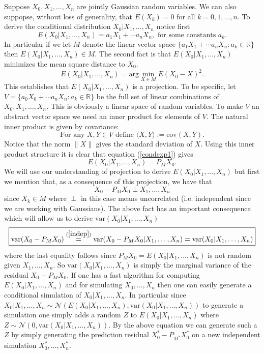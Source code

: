 \documentclass[11pt]{report}
\begin{document}
Suppose $X_0,X_1,\ldots, X_n$ are jointly Gaussian random variables. We can also suppopse, without loss of generality, that $E(X_k)=0$ for all $k=0,1,\ldots, n$.
To derive the conditional distribution $X_0|X_1,\ldots, X_n$ notice first
\[
{E(X_0|X_1,\ldots, X_n) = a_1 X_1 + \cdots a_n X_n,\text{ for some constants $a_k$.}}
\]
In particular if we let $M$ denote the linear vector space $\{a_1 X_1 + \cdots a_n X_n: a_k\in\mathbb R\}$ then $E(X_0|X_1,\ldots, X_n)\in M$. The second fact is that  $E(X_0|X_1,\ldots, X_n)$ minimizes the mean square distance to $X_0$. 
\begin{equation}\label{condexp1}
{E(X_0|X_1,\ldots, X_n) = \text{arg}\min_{X \in M} E(X_0 - X)^2. }
\end{equation}
 This establishes that $E(X_0|X_1,\ldots, X_n)$ is a projection. To be specific, let $V=\{a_0 X_0 + \cdots a_n X_n: a_k\in\mathbb R\}$ be the full set of linear combinations of $X_0,X_1,\ldots, X_n$. This is obviously a linear space of random variables. To make $V$ an abstract vector space we need an inner product for elements of $V$. The natural inner product is given by covariance:
\[ \text{For any $X,Y\in V$ define $\langle X,Y\rangle :=\text{cov}(X,Y)$.}  \]
Notice that the norm $\| X\|$ gives the standard deviation of $X$. Using this inner product structure it is clear that equation (\ref{condexp1}) gives
\begin{equation}
\label{condexp2} 
\boxed{E(X_0|X_1,\ldots, X_n) = P_M X_0.} 
\end{equation}
We will use our understanding of projection to derive $E(X_0|X_1,\ldots, X_n)$ but first we mention that,
as a consequence of this projection, we have that 
\begin{equation} 
\label{indep}
\boxed{X_0 - P_M X_0 \perp X_1,\ldots, X_n}
\end{equation}
since $X_k\in M$
where $\perp$ in this case means uncorrelated (i.e. independent since we are working with Gaussians). The above fact has an important consequence which will allow us to derive $\text{var}(X_0|X_1,\ldots, X_n)$
\[
\boxed{\text{var}(X_0 - P_M X_0 ) \overset{(\ref{indep})}= \text{var}(X_0 - P_M X_0 |X_1,\ldots, X_n) = \text{var}(X_0  |X_1,\ldots, X_n)}
\]
where the last equality follows since $P_M X_0= E(X_0|X_1,\ldots, X_n)$ is not random given $X_1,\ldots, X_n$.
So $\text{var}(X_0  |X_1,\ldots, X_n)$ is simply the marginal variance of the residual $X_0 - P_M X_0$.  If one has a fast algorithm for computing  $E(X_0|X_1,\ldots, X_n)$  and for simulating $X_0,\ldots, X_n$ then one can easily generate a conditional simulation of $X_0  |X_1,\ldots, X_n$. In particular since $X_0  |X_1,\ldots, X_n\sim \mathcal N(E(X_0|X_1,\ldots, X_n), \text{var}(X_0|X_1,\ldots, X_n))$ to generate a simulation  one simply adds a random $Z$ to  $E(X_0|X_1,\ldots, X_n) $ where $Z\sim \mathcal N(0, \text{var}(X_0|X_1,\ldots, X_n))$. By the above equation we can generate such a $Z$ by simply generating the prediction residual $X^*_0 - P_{M^*} X_0^*$ on a new independent simulation $X_0^*, \ldots, X_n^*$.
\end{document}
